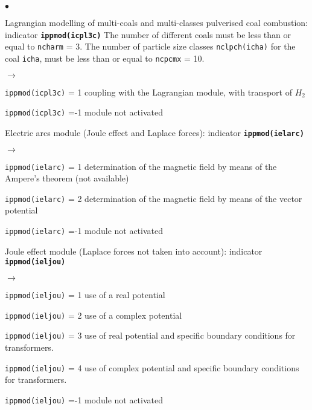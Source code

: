 {{\begin{list}{$\bullet$}{}
        \item Lagrangian modelling of multi-coals and
             multi-classes pulverised coal combustion:
                 indicator {\bf \tt ippmod(icpl3c)}
              The number of different coals must be less than or equal to
              \texttt{ncharm} = 3. The number of particle size
             classes \texttt{nclpch(icha)} for the coal
             \texttt{icha}, must be less than or equal to
             \texttt{ncpcmx} = 10.
         \begin{list}{$\rightarrow$}{}
                \item \texttt{ippmod(icpl3c)} = 1 coupling with the Lagrangian
                      module, with transport of $H_2$
                \item \texttt{ippmod(icpl3c)} =-1 module not activated
         \end{list}
       \item Electric arcs module (Joule effect and Laplace forces):
             indicator {\bf \tt ippmod(ielarc)}
        \begin{list}{$\rightarrow$}{}
               \item \texttt{ippmod(ielarc)} = 1 determination of the magnetic field by
                     means of the Ampere's theorem (not available)
               \item \texttt{ippmod(ielarc)} = 2 determination of the magnetic
                     field by means of the vector potential
               \item \texttt{ippmod(ielarc)} =-1 module not activated
         \end{list}
       \item Joule effect module (Laplace forces not taken into account):
             indicator {\bf \tt ippmod(ieljou)}
        \begin{list}{$\rightarrow$}{}
               \item \texttt{ippmod(ieljou)} = 1 use of a real potential
               \item \texttt{ippmod(ieljou)} = 2 use of a complex potential
               \item \texttt{ippmod(ieljou)} = 3 use of real potential and specific boundary conditions for transformers.
               \item \texttt{ippmod(ieljou)} = 4 use of complex potential and specific boundary conditions for transformers.
               \item \texttt{ippmod(ieljou)} =-1 module not activated

\end{list}
\end{list}}}
